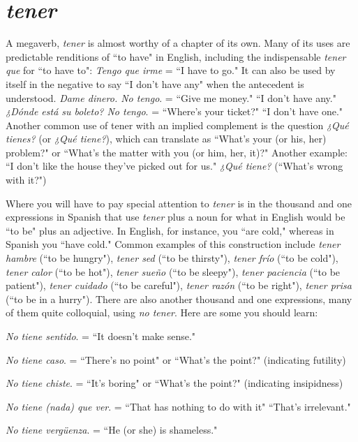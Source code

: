 \section{\emph{tener}}

A megaverb, \emph{tener} is almost worthy of a chapter of its own.
Many of its uses are predictable renditions of ``to have" in English, including the indispensable \emph{tener que} for ``to have to": \emph{Tengo que irme}
= ``I have to go." It can also be used by itself in the negative to say ``I
don't have any" when the antecedent is understood. \emph{Dame dinero. No
tengo}. = ``Give me money." ``I don't have any." \emph{¿Dónde está su boleto?
No tengo}. = ``Where's your ticket?" ``I don't have one." Another common use of tener with an implied complement is the question \emph{¿Qué
tienes?} (or \emph{¿Qué tiene?}), which can translate as ``What's your (or his,
her) problem?" or ``What's the matter with you (or him, her, it)?" Another example: ``I don't like the house they've picked out for us." \emph{¿Qué
tiene?} (``What's wrong with it?")

Where you will have to pay special attention to \emph{tener} is in the
thousand and one expressions in Spanish that use \emph{tener} plus a noun for
what in English would be ``to be" plus an adjective. In English, for instance, you ``are cold," whereas in Spanish you ``have cold." Common
examples of this construction include \emph{tener hambre} (``to be hungry"),
\emph{tener sed} (``to be thirsty"), \emph{tener frío} (``to be cold"), \emph{tener calor} (``to be
hot"), \emph{tener sueño} (``to be sleepy"), \emph{tener paciencia} (``to be patient"),
\emph{tener cuidado} (``to be careful"), \emph{tener razón} (``to be right"), \emph{tener prisa}
(``to be in a hurry").
There are also another thousand and one expressions, many of
them quite colloquial, using \emph{no tener}. Here are some you should learn:

\bsk

\indu \emph{No tiene sentido}. = ``It doesn't make sense."

\indu \emph{No tiene caso}. = ``There's no point" or ``What's the point?"
(indicating futility)

\indu \emph{No tiene chiste}. = ``It's boring" or ``What's the point?" (indicating insipidness)

\indu \emph{No tiene (nada) que ver}. = ``That has nothing to do with it"
``That's irrelevant."

\indu \emph{No tiene vergüenza}. = ``He (or she) is shameless."

